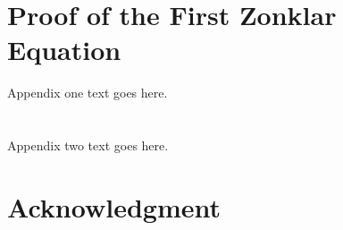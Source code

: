 \documentclass[journal]{IEEEtran}
\begin{document}



%


\appendices
\section{Proof of the First Zonklar Equation}
Appendix one text goes here.

\section{}
Appendix two text goes here.


\section*{Acknowledgment}
\end{document}
